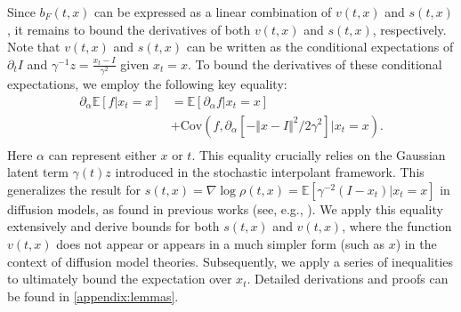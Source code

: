 Since $b_F(t,x)$ can be expressed as a linear combination of $v(t,x)$ and $s(t,x)$, it remains to bound the derivatives of both $v(t,x)$ and $s(t,x)$, respectively.  %
Note that $v(t,x)$ and $s(t,x)$ can be written as the conditional expectations of $\partial_tI$ and $\gamma^{-1}z=\frac{x_t-I}{\gamma^2}$ given $x_t=x$. To bound the derivatives of these conditional expectations, we employ the following key equality:
$$\begin{aligned}
    \partial_{\alpha}\mathbb{E}[f|x_t=x]
    &=\mathbb{E}[\partial_{\alpha}f|x_t=x]\\
    &+\text{Cov}(f,\partial_{\alpha}[-\Vert x-I\Vert^2/2\gamma^2]|x_t=x).\\
\end{aligned}$$
Here $\alpha$ can represent either $x$ or $t$. This equality crucially relies on the Gaussian latent term $\gamma(t)z$ introduced in the stochastic interpolant framework. This generalizes the result for $s(t,x)=\nabla\log\rho(t,x)=\mathbb{E}[\gamma^{-2}(I-x_t)|x_t=x]$ %
in diffusion models, as found in previous works (see, e.g., \citealt{manifold, dlinear}). We apply this equality extensively and derive bounds for both $s(t,x)$ and $v(t,x)$, where the function $v(t,x)$ does not appear or appears in a much simpler form (such as $x$) in the context of diffusion model theories. Subsequently, we apply a series of inequalities to ultimately bound the expectation over $x_t$. Detailed derivations and proofs can be found in \ref{appendix:lemmas}.



